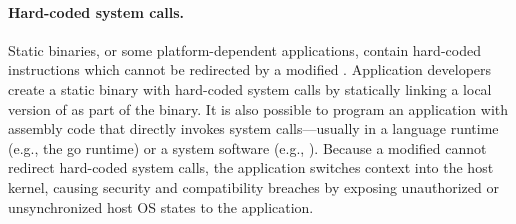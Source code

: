 \paragraph{Hard-coded system calls.}
Static binaries, or some platform-dependent applications, contain hard-coded  instructions
which cannot be redirected by a modified \libc{}.
Application developers
create a static binary with hard-coded system calls by statically linking a local version of \libc{} as part of the binary.
It is also possible to program an application
with assembly code that directly invokes system calls---usually in a language runtime (e.g., the go runtime) or a system software (e.g., ).
Because a modified \libc{} cannot redirect hard-coded system calls,
the application switches context into the host kernel,
causing security and compatibility breaches by exposing unauthorized or unsynchronized host OS states to the application.




